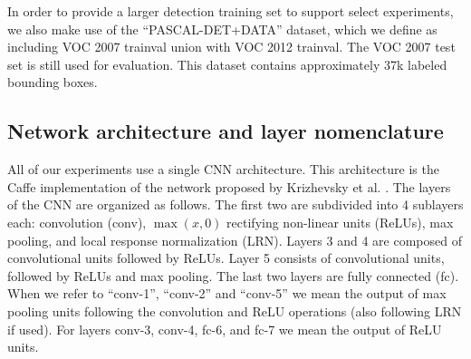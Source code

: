 In order to provide a larger detection training set to support select experiments, we also make use of the ``PASCAL-DET+DATA'' dataset, which we define as including VOC 2007 trainval union with VOC 2012 trainval.
The VOC 2007 test set is still used for evaluation.
This dataset contains approximately 37k labeled bounding boxes.

\subsection{Network architecture and layer nomenclature}
\label{sub:net-arch}
All of our experiments use a single CNN architecture.
This architecture is the Caffe \cite{caffe} implementation of the network proposed by Krizhevsky et al. \cite{Kriz}.
The layers of the CNN are organized as follows.
The first two are subdivided into 4 sublayers each: convolution (conv), $\max(x,0)$ rectifying non-linear units (ReLUs), max pooling, and local response normalization (LRN). 
Layers 3 and 4 are composed of convolutional units followed by ReLUs.
Layer 5 consists of convolutional units, followed by ReLUs and max pooling.
The last two layers are fully connected (fc). 
When we refer to ``conv-1'', ``conv-2'' and ``conv-5'' we mean the output of max pooling units following the convolution and ReLU operations (also following LRN if used).
For layers conv-3, conv-4, fc-6, and fc-7 we mean the output of ReLU units.

 
